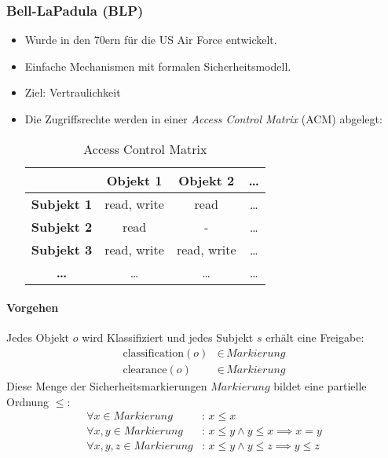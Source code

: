             \subsubsection{Bell-LaPadula (BLP)}
                \begin{itemize}
                	\item Wurde in den 70ern für die US Air Force entwickelt.
                	\item Einfache Mechanismen mit formalen Sicherheitsmodell.
                	\item Ziel: Vertraulichkeit
                	\item Die Zugriffsrechte werden in einer \textit{Access Control Matrix} (ACM) abgelegt:
                    	\begin{table}[H]
                    		\centering
                    		\begin{tabular}{| c | c | c | c |}
                    			\hline
                    			                   & \textbf{Objekt 1} & \textbf{Objekt 2} & \textbf{\dots} \\ \hline
                    			\textbf{Subjekt 1} & read, write       & read              & \dots          \\ \hline
                    			\textbf{Subjekt 2} & read              & -                 & \dots          \\ \hline
                    			\textbf{Subjekt 3} & read, write       & read, write       & \dots          \\ \hline
                    			\textbf{\dots}     & \dots             & \dots             & \dots          \\ \hline
                    		\end{tabular}
                    		\caption{Access Control Matrix}
                    	\end{table}
                \end{itemize}
            
                \paragraph{Vorgehen}
	                Jedes Objekt \(o\) wird Klassifiziert und jedes Subjekt \(s\) erhält eine Freigabe:
	                \begin{align*}
	                	\text{classification}(o) & \in\, \textit{Markierung} \\
	                	\text{clearance}(o)      & \in\, \textit{Markierung}
	                \end{align*}
	                Diese Menge der Sicherheitsmarkierungen \(\textit{Markierung}\) bildet eine partielle Ordnung \(\leq\):
	                \begin{align*}
	                	\forall x \in \textit{Markierung}       & :\, x \leq x                                  \\
	                	\forall x, y \in \textit{Markierung}    & :\, x \leq y \land y \leq x \implies x = y    \\
	                	\forall x, y, z \in \textit{Markierung} & :\, x \leq y \land y \leq z \implies y \leq z
	                \end{align*}
	                
